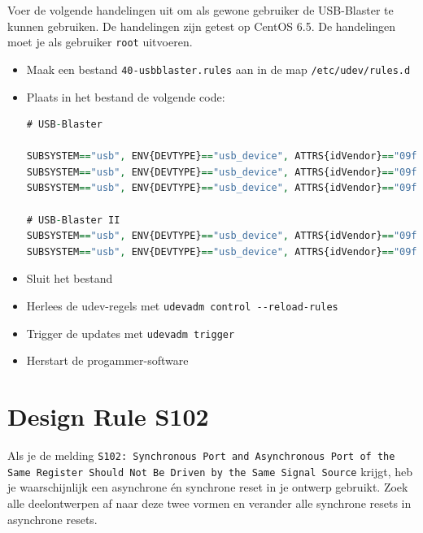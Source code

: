 \documentclass[a4paper,12pt,fleqn,twoside]{book}
\begin{document}
Voer de volgende handelingen uit om als gewone gebruiker de USB-Blaster te
kunnen gebruiken. De handelingen zijn getest op CentOS 6.5. De handelingen
moet je als gebruiker \lstinline|root| uitvoeren.

\begin{itemize}\itemsep-1pt
\item Maak een bestand \lstinline|40-usbblaster.rules| aan in de map
      \lstinline|/etc/udev/rules.d|
\item Plaats in het bestand de volgende code:
\begin{lstlisting}[language=VHDL,numbers=none,belowskip=-3.5ex]
# USB-Blaster

SUBSYSTEM=="usb", ENV{DEVTYPE}=="usb_device", ATTRS{idVendor}=="09fb", ATTRS{idProduct}=="6001", MODE="0666", SYMLINK+="usbblaster/%k"
SUBSYSTEM=="usb", ENV{DEVTYPE}=="usb_device", ATTRS{idVendor}=="09fb", ATTRS{idProduct}=="6002", MODE="0666", SYMLINK+="usbblaster/%k"
SUBSYSTEM=="usb", ENV{DEVTYPE}=="usb_device", ATTRS{idVendor}=="09fb", ATTRS{idProduct}=="6003", MODE="0666", SYMLINK+="usbblaster/%k"

# USB-Blaster II
SUBSYSTEM=="usb", ENV{DEVTYPE}=="usb_device", ATTRS{idVendor}=="09fb", ATTRS{idProduct}=="6010", MODE="0666", SYMLINK+="usbblaster2/%k"
SUBSYSTEM=="usb", ENV{DEVTYPE}=="usb_device", ATTRS{idVendor}=="09fb", ATTRS{idProduct}=="6810", MODE="0666", SYMLINK+="usbblaster2/%k"
\end{lstlisting}
\item Sluit het bestand
\item Herlees de udev-regels met \lstinline|udevadm control --reload-rules|
\item Trigger de updates met \lstinline|udevadm trigger|
\item Herstart de progammer-software
\end{itemize}


\section{Design Rule S102}
Als je de melding \lstinline|S102: Synchronous Port and Asynchronous Port of the Same Register Should Not Be Driven by the Same Signal Source|
krijgt, heb je waarschijnlijk een asynchrone \'{e}n synchrone reset in je
ontwerp gebruikt. Zoek alle deelontwerpen af naar deze twee vormen en verander
alle synchrone resets in asynchrone resets.
\end{document}
